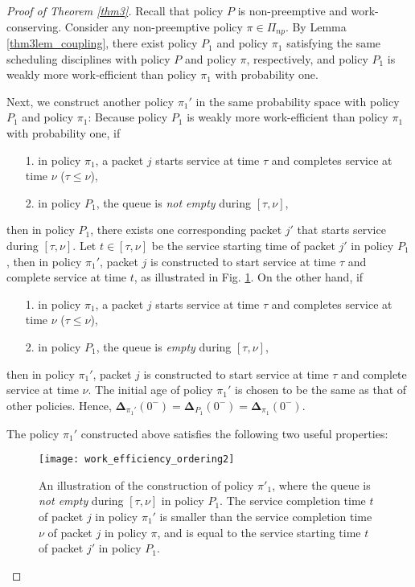 \begin{proof}[Proof of Theorem \ref{thm3}]
Recall that policy $P$ is non-preemptive and work-conserving. 
 Consider any non-preemptive policy $\pi\in\Pi_{np}$.
By Lemma \ref{thm3lem_coupling}, there exist policy $P_1$ and policy $\pi_1$
satisfying the same scheduling disciplines with policy $P$ and policy $\pi$, respectively, and policy $P_1$ is weakly more work-efficient than policy $\pi_1$ with probability one.

Next, we construct another policy $\pi_1'$ in the same probability space with policy  $P_1$ and policy $\pi_1$: 
Because policy $P_1$ is weakly more work-efficient than policy $\pi_1$ with probability one, if
\begin{itemize}
\item[1.] in policy $\pi_1$, a packet $j$ starts service at time $\tau$ and completes service at time $\nu$ ($\tau\leq \nu$),
\item[2.] in policy $P_1$, the queue is \emph{not empty} during $[\tau,\nu]$,
\end{itemize}
then  in policy $P_1$, there exists one corresponding packet $j'$ that starts service during $[\tau,\nu]$. Let  $t\in [\tau,\nu]$ be the service starting time of packet $j'$ in policy $P_1$, then  in policy $\pi_1'$, packet $j$ is constructed to start service at time $\tau$ and complete service at time $t$, as illustrated in Fig. \ref{Work_Efficiency_Ordering2}. On the other hand, if
\begin{itemize}
\item[1.] in policy $\pi_1$, a packet $j$ starts service at time $\tau$ and completes service at time $\nu$ ($\tau\leq \nu$),
\item[2.] in policy $P_1$, the queue is \emph{empty} during $[\tau,\nu]$,
\end{itemize}
then in policy $\pi_1'$, packet $j$ is constructed to start service at time $\tau$ and complete service at time $\nu$. 
The initial age of policy $\pi_1'$ is chosen to be the same as that of other policies. Hence, $ \bm\Delta_{\pi_1'}(0^-) = \bm\Delta_{P_1}(0^-) = \bm\Delta_{\pi_1}(0^-)$. 


The  policy $\pi_1'$ constructed above satisfies the following two useful properties: 
\begin{figure}
\centering 
\texttt{[image: work\_efficiency\_ordering2]} \caption{An illustration of the construction of policy $\pi'_1$, where the queue is \emph{not empty} during $[\tau,\nu]$ in policy $P_1$. The service completion time $t$ of packet $j$ in policy $\pi_1'$ is smaller than the service completion time $\nu$ of packet $j$ in policy $\pi$, and is equal to the service starting time $t$ of packet $j'$ in policy $P_1$. }
\label{Work_Efficiency_Ordering2} 
\end{figure} 




\end{proof}
